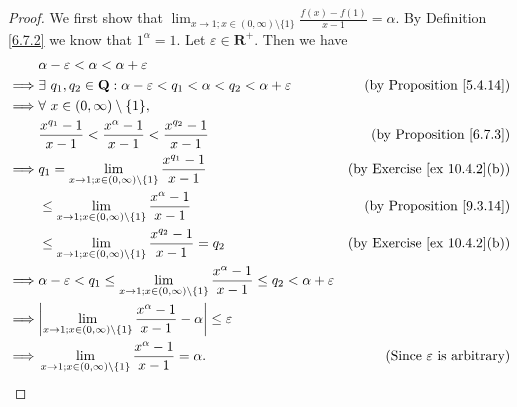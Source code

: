 \begin{proof}
    We first show that \(\lim_{x \to 1 ; x \in (0, \infty) \setminus \{1\}} \frac{f(x) - f(1)}{x - 1} = \alpha\).
    By Definition \ref{6.7.2} we know that \(1^{\alpha} = 1\).
    Let \(\varepsilon \in \mathbf{R}^+\).
    Then we have
    \begin{align*}
                 & \alpha - \varepsilon < \alpha < \alpha + \varepsilon                                                                                                                                          \\
        \implies & \exists\ q_1, q_2 \in \mathbf{Q} : \alpha - \varepsilon < q_1 < \alpha < q_2 < \alpha + \varepsilon                                             & \text{(by Proposition \ref{5.4.14})}        \\
        \implies & \forall\ x \in (0, \infty) \setminus \{1\},                                                                                                                                                   \\
                 & \frac{x^{q_1} - 1}{x - 1} < \frac{x^{\alpha} - 1}{x - 1} < \frac{x^{q_2} - 1}{x - 1}                                                            & \text{(by Proposition \ref{6.7.3})}         \\
        \implies & q_1 = \lim_{x \to 1 ; x \in (0, \infty) \setminus \{1\}} \frac{x^{q_1} - 1}{x - 1}                                                              & \text{(by Exercise \ref{ex 10.4.2}(b))}     \\
                 & \leq \lim_{x \to 1 ; x \in (0, \infty) \setminus \{1\}} \frac{x^{\alpha} - 1}{x - 1}                                                            & \text{(by Proposition \ref{9.3.14})}        \\
                 & \leq \lim_{x \to 1 ; x \in (0, \infty) \setminus \{1\}} \frac{x^{q_2} - 1}{x - 1} = q_2                                                         & \text{(by Exercise \ref{ex 10.4.2}(b))}     \\
        \implies & \alpha - \varepsilon < q_1 \leq \lim_{x \to 1 ; x \in (0, \infty) \setminus \{1\}} \frac{x^{\alpha} - 1}{x - 1} \leq q_2 < \alpha + \varepsilon                                               \\
        \implies & \abs*{\lim_{x \to 1 ; x \in (0, \infty) \setminus \{1\}} \frac{x^{\alpha} - 1}{x - 1} - \alpha} \leq \varepsilon                                                                              \\
        \implies & \lim_{x \to 1 ; x \in (0, \infty) \setminus \{1\}} \frac{x^{\alpha} - 1}{x - 1} = \alpha.                                                       & \text{(Since \(\varepsilon\) is arbitrary)}
    \end{align*}


\end{proof}

